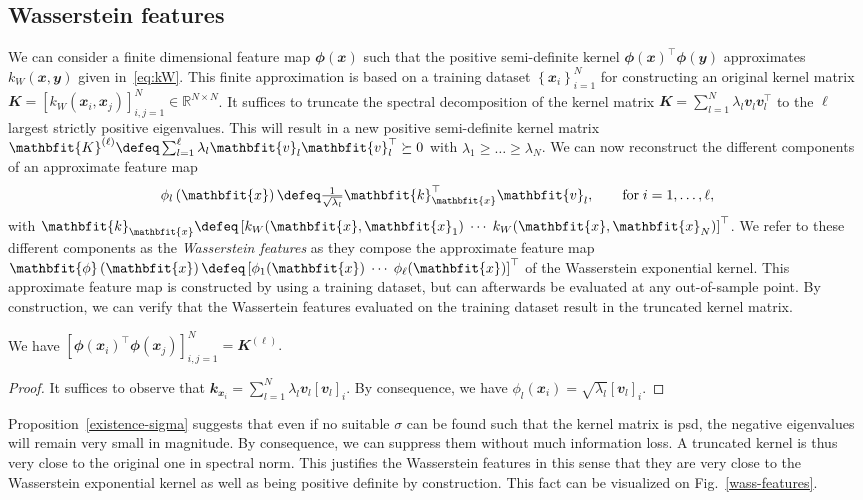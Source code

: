 \subsection{Wasserstein features}
We can consider a finite dimensional feature map $\mathbfit{\phi}(\mathbfit{x})$ such that the positive semi-definite kernel $\mathbfit{\phi}(\mathbfit{x})^\top \mathbfit{\phi}(\mathbfit{y})$ approximates $k_W(\mathbfit{x},\mathbfit{y})$ given in~\eqref{eq:kW}. This finite approximation is based on a training dataset $\left\{ \mathbfit{x}_i\right\}_{i=1}^N$ for constructing an original kernel matrix $\mathbfit{K} = \left[k_W(\mathbfit{x}_i,\mathbfit{x}_j)\right]_{i,j=1}^N \in \mathbb{R}^{N \times N}$. It suffices to truncate the spectral decomposition of the kernel matrix $\mathbfit{K} = \sum_{l=1}^N \lambda_l \mathbfit{v}_l \mathbfit{v}_l^\top$ to the $\ell$ largest strictly positive eigenvalues. This will result in a new positive semi-definite kernel matrix $\mathbfit{K}^{(\ell)} \defeq \sum_{l=1}^\ell \lambda_l \mathbfit{v}_l \mathbfit{v}_l^\top \succeq 0$ with $\lambda_1\geq \dots\geq \lambda_N$. We can now reconstruct the different components of an approximate feature map
\begin{equation}
    \phi_l\left(\mathbfit{x} \right) \defeq \tfrac{1}{\sqrt{\lambda_l}} \mathbfit{k}_{\mathbfit{x}}^\top \mathbfit{v}_l, \qquad \mathrm{for}\; i=1,\ldots,\ell,\label{eq:ApproxFeatureMap}
\end{equation}
with $\mathbfit{k}_{\mathbfit{x}} \defeq \left[ k_W(\mathbfit{x},\mathbfit{x}_1) \; \cdots \; k_W(\mathbfit{x},\mathbfit{x}_N) \right]^\top$. We refer to these different components as the \emph{Wasserstein features} as they compose the approximate feature map $\mathbfit{\phi}\left(\mathbfit{x}\right) \defeq \left[ \phi_1(\mathbfit{x}) \; \cdots \; \phi_\ell(\mathbfit{x}) \right]^\top$ of the Wasserstein exponential kernel. This approximate feature map is constructed by using a training dataset, but can afterwards be evaluated at any out-of-sample point. By construction, we can verify that the Wassertein features evaluated on the training dataset result in the truncated kernel matrix.
\begin{proposition}
    We have
$    \left[ \mathbfit{\phi}(\mathbfit{x}_i)^\top \mathbfit{\phi}(\mathbfit{x}_j)\right]_{i,j=1}^N = \mathbfit{K}^{(\ell)}.
$\label{prop:Kk}
\end{proposition}
\begin{proof}
It suffices to observe that $\mathbfit{k}_{\mathbfit{x}_i} = \sum_{l=1}^N \lambda_l \mathbfit{v}_l \left[\mathbfit{v}_l\right]_i$. By consequence, we have $\phi_l(\mathbfit{x}_i) = \sqrt{\lambda_l}\left[\mathbfit{v}_l \right]_i$.
\end{proof}
Proposition~\ref{existence-sigma} suggests that even if no suitable $\sigma$ can be found such that the kernel matrix is psd, the negative eigenvalues will remain very small in magnitude. By consequence, we can suppress them without much information loss. A truncated kernel is thus very close to the original one in spectral norm. This justifies the Wasserstein features in this sense that they are very close to the Wasserstein exponential kernel as well as being positive definite by construction. This fact can be visualized on Fig.~\ref{wass-features}.


